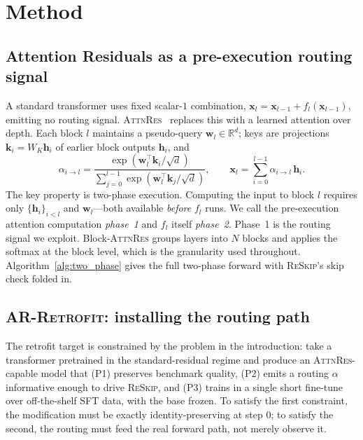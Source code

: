 \documentclass{article}
\newcommand{\attnres}{\textsc{AttnRes}}
\newcommand{\reskip}{\textsc{ReSkip}}
\newcommand{\retrofit}{\textsc{AR-Retrofit}}
\newcommand{\R}{\mathbb{R}}
\begin{document}
\section{Method}
\label{sec:method}

\subsection{Attention Residuals as a pre-execution routing signal}
\label{sec:background}

A standard transformer uses fixed scalar-$1$ combination, $\mathbf{x}_l = \mathbf{x}_{l-1} + f_l(\mathbf{x}_{l-1})$, emitting no routing signal. \attnres{}~\citep{chen2026attnres} replaces this with a learned attention over depth. Each block $l$ maintains a pseudo-query $\mathbf{w}_l \in \R^d$; keys are projections $\mathbf{k}_i = W_K \mathbf{h}_i$ of earlier block outputs $\mathbf{h}_i$, and
\begin{equation}
  \alpha_{i \to l} = \frac{\exp(\mathbf{w}_l^\top \mathbf{k}_i / \sqrt{d})}{\sum_{j=0}^{l-1} \exp(\mathbf{w}_l^\top \mathbf{k}_j / \sqrt{d})},
  \qquad
  \mathbf{x}_l = \sum_{i=0}^{l-1} \alpha_{i \to l}\,\mathbf{h}_i .
  \label{eq:attnres}
\end{equation}
The key property is two-phase execution. Computing the input to block $l$ requires only $\{\mathbf{h}_i\}_{i<l}$ and $\mathbf{w}_l$---both available \emph{before} $f_l$ runs. We call the pre-execution attention computation \emph{phase~1} and $f_l$ itself \emph{phase~2}. Phase~1 is the routing signal we exploit. Block-\attnres{} groups layers into $N$ blocks and applies the softmax at the block level, which is the granularity used throughout. Algorithm~\ref{alg:two_phase} gives the full two-phase forward with \reskip{}'s skip check folded in.

\subsection{\retrofit{}: installing the routing path}
\label{sec:retrofit}

The retrofit target is constrained by the problem in the introduction: take a transformer pretrained in the standard-residual regime and produce an \attnres{}-capable model that (P1) preserves benchmark quality, (P2) emits a routing $\alpha$ informative enough to drive \reskip{}, and (P3) trains in a single short fine-tune over off-the-shelf SFT data, with the base frozen. To satisfy the first constraint, the modification must be exactly identity-preserving at step $0$; to satisfy the second, the routing must feed the real forward path, not merely observe it.
\end{document}
